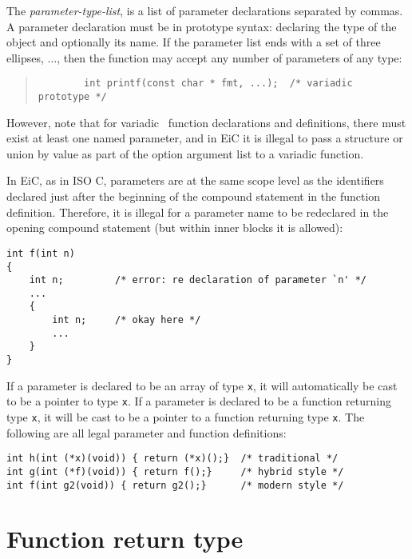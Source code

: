 The {\it parameter-type-list}, is a list of parameter declarations
separated by commas. A parameter declaration must be in prototype
syntax: declaring the type of the object and optionally its name.  If
the parameter list ends with a set of three ellipses, $\ldots$, then
the function may accept any number of parameters of any type:
\begin{quote}
\begin{verbatim}
        int printf(const char * fmt, ...);  /* variadic prototype */
\end{verbatim}
\end{quote}

However, note that for variadic~ function
declarations and definitions, there must exist at least one named
parameter, and in EiC it is illegal to pass a structure or union by
value as part of the option argument list to a variadic function.

In EiC, as in ISO C, parameters are at the same scope level as the
identifiers declared just after the beginning of the compound
statement in the function definition. Therefore, it is illegal for a
parameter name to be redeclared in the opening compound statement (but
within inner blocks it is allowed):

\begin{production}
\begin{verbatim}
int f(int n)
{
    int n;         /* error: re declaration of parameter `n' */
    ...
    {
        int n;     /* okay here */
        ...
    }
}
\end{verbatim}
\end{production}

If a parameter is declared to be an array of type {\tt x}, it will
automatically be cast to be a pointer to type {\tt x}. If a parameter is
declared to be a function returning type {\tt x}, it will be cast to be a
pointer to a function returning type {\tt x}. The following are all
legal parameter and function definitions:

\begin{production}
\begin{verbatim}
int h(int (*x)(void)) { return (*x)();}  /* traditional */
int g(int (*f)(void)) { return f();}     /* hybrid style */
int f(int g2(void)) { return g2();}      /* modern style */
\end{verbatim}
\end{production}
 

\section{Function return type}
\label{sec:FunctionReturnType}

